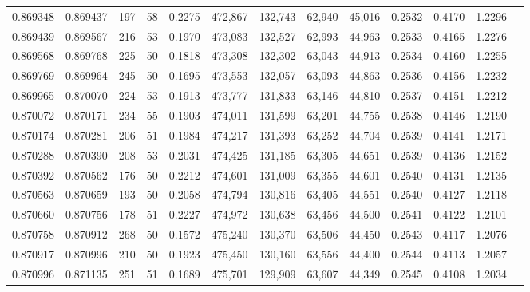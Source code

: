 \begin{tabular}{rrrrrrrrrrrrr}
0.869348 & 0.869437 &   197 &  58 &                                     0.2275 & 472,867 & 132,743 &  62,940 &  45,016 & 0.2532 & 0.4170 & 1.2296 \\
0.869439 & 0.869567 &   216 &  53 &                                     0.1970 & 473,083 & 132,527 &  62,993 &  44,963 & 0.2533 & 0.4165 & 1.2276 \\
0.869568 & 0.869768 &   225 &  50 &                                     0.1818 & 473,308 & 132,302 &  63,043 &  44,913 & 0.2534 & 0.4160 & 1.2255 \\
0.869769 & 0.869964 &   245 &  50 &                                     0.1695 & 473,553 & 132,057 &  63,093 &  44,863 & 0.2536 & 0.4156 & 1.2232 \\
0.869965 & 0.870070 &   224 &  53 &                                     0.1913 & 473,777 & 131,833 &  63,146 &  44,810 & 0.2537 & 0.4151 & 1.2212 \\
0.870072 & 0.870171 &   234 &  55 &                                     0.1903 & 474,011 & 131,599 &  63,201 &  44,755 & 0.2538 & 0.4146 & 1.2190 \\
0.870174 & 0.870281 &   206 &  51 &                                     0.1984 & 474,217 & 131,393 &  63,252 &  44,704 & 0.2539 & 0.4141 & 1.2171 \\
0.870288 & 0.870390 &   208 &  53 &                                     0.2031 & 474,425 & 131,185 &  63,305 &  44,651 & 0.2539 & 0.4136 & 1.2152 \\
0.870392 & 0.870562 &   176 &  50 &                                     0.2212 & 474,601 & 131,009 &  63,355 &  44,601 & 0.2540 & 0.4131 & 1.2135 \\
0.870563 & 0.870659 &   193 &  50 &                                     0.2058 & 474,794 & 130,816 &  63,405 &  44,551 & 0.2540 & 0.4127 & 1.2118 \\
0.870660 & 0.870756 &   178 &  51 &                                     0.2227 & 474,972 & 130,638 &  63,456 &  44,500 & 0.2541 & 0.4122 & 1.2101 \\
0.870758 & 0.870912 &   268 &  50 &                                     0.1572 & 475,240 & 130,370 &  63,506 &  44,450 & 0.2543 & 0.4117 & 1.2076 \\
0.870917 & 0.870996 &   210 &  50 &                                     0.1923 & 475,450 & 130,160 &  63,556 &  44,400 & 0.2544 & 0.4113 & 1.2057 \\
0.870996 & 0.871135 &   251 &  51 &                                     0.1689 & 475,701 & 129,909 &  63,607 &  44,349 & 0.2545 & 0.4108 & 1.2034 \\

\end{tabular}
